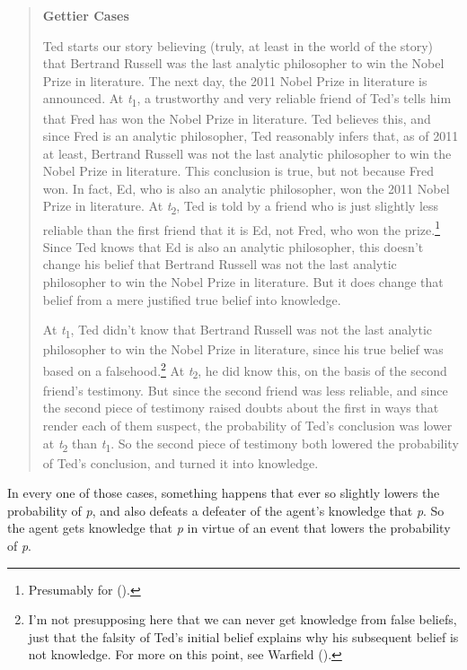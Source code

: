 \documentclass[
  11pt,
  letterpaper,
  DIV=11,
  numbers=noendperiod,
  twoside]{scrartcl}
\begin{document}
\begin{quote}
\textbf{Gettier Cases}

Ted starts our story believing (truly, at least in the world of the
story) that Bertrand Russell was the last analytic philosopher to win
the Nobel Prize in literature. The next day, the 2011 Nobel Prize in
literature is announced. At \emph{t}\textsubscript{1}, a trustworthy and
very reliable friend of Ted's tells him that Fred has won the Nobel
Prize in literature. Ted believes this, and since Fred is an analytic
philosopher, Ted reasonably infers that, as of 2011 at least, Bertrand
Russell was not the last analytic philosopher to win the Nobel Prize in
literature. This conclusion is true, but not because Fred won. In fact,
Ed, who is also an analytic philosopher, won the 2011 Nobel Prize in
literature. At \emph{t}\textsubscript{2}, Ted is told by a friend who is
just slightly less reliable than the first friend that it is Ed, not
Fred, who won the prize.\footnote{Presumably for
  ().} Since Ted knows that Ed
is also an analytic philosopher, this doesn't change his belief that
Bertrand Russell was not the last analytic philosopher to win the Nobel
Prize in literature. But it does change that belief from a mere
justified true belief into knowledge.

At \emph{t}\textsubscript{1}, Ted didn't know that Bertrand Russell was
not the last analytic philosopher to win the Nobel Prize in literature,
since his true belief was based on a falsehood.\footnote{I'm not
  presupposing here that we can never get knowledge from false beliefs,
  just that the falsity of Ted's initial belief explains why his
  subsequent belief is not knowledge. For more on this point, see
  Warfield ().} At
\emph{t}\textsubscript{2}, he did know this, on the basis of the second
friend's testimony. But since the second friend was less reliable, and
since the second piece of testimony raised doubts about the first in
ways that render each of them suspect, the probability of Ted's
conclusion was lower at \emph{t}\textsubscript{2} than
\emph{t}\textsubscript{1}. So the second piece of testimony both lowered
the probability of Ted's conclusion, and turned it into knowledge.
\end{quote}

In every one of those cases, something happens that ever so slightly
lowers the probability of \emph{p}, and also defeats a defeater of the
agent's knowledge that \emph{p}. So the agent gets knowledge that
\emph{p} in virtue of an event that lowers the probability of \emph{p}.
\end{document}
